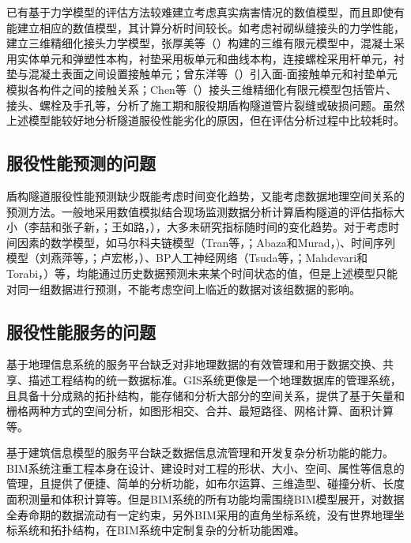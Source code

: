 已有基于力学模型的评估方法较难建立考虑真实病害情况的数值模型，而且即使有能建立相应的数值模型，其计算分析时间较长。如考虑衬砌纵缝接头的力学性能，建立三维精细化接头力学模型，张厚美等（\citeyear{张厚美2000圆形隧道装配式衬砌接头刚度模型研究}）构建的三维有限元模型中，混凝土采用实体单元和弹塑性本构，衬垫采用板单元和曲线本构，连接螺栓采用杆单元，衬垫与混凝土表面之间设置接触单元；曾东洋等（\citeyear{曾东洋2005地铁盾构隧道管片接头刚度影响因素研究}）引入面-面接触单元和衬垫单元模拟各构件之间的接触关系；Chen等（\citeyear{chen2009numerical}）接头三维精细化有限元模型包括管片、接头、螺栓及手孔等，分析了施工期和服役期盾构隧道管片裂缝或破损问题。虽然上述模型能较好地分析隧道服役性能劣化的原因，但在评估分析过程中比较耗时。

\subsection{服役性能预测的问题}

盾构隧道服役性能预测缺少既能考虑时间变化趋势，又能考虑数据地理空间关系的预测方法。一般地采用数值模拟结合现场监测数据分析计算盾构隧道的评估指标大小（李喆和张子新，\citeyear{李喆2005相邻隧道施工对上海地铁二号线的影响分析}；王如路，\citeyear{王如路2009上海软土地铁隧道变形影响因素及变形特征分析}），大多未研究指标随时间的变化趋势。对于考虑时间因素的数学模型，如马尔科夫链模型（Tran等，\citeyear{tran2008prediction}；Abaza和Murad，\citeyear{abaza2009predicting})、时间序列模型（刘燕萍等，\citeyear{刘燕萍2010时间序列分析在建筑物变形监测中的应用}；卢宏彬，\citeyear{卢宏彬2016基于时间序列的结构损伤概率方法研究}）、BP人工神经网络（Tsuda等，\citeyear{tsuda2006estimating}；Mahdevari和Torabi，\citeyear{mahdevari2012prediction}）等，均能通过历史数据预测未来某个时间状态的值，但是上述模型只能对同一组数据进行预测，不能考虑空间上临近的数据对该组数据的影响。

\subsection{服役性能服务的问题}

基于地理信息系统的服务平台缺乏对非地理数据的有效管理和用于数据交换、共享、描述工程结构的统一数据标准。GIS系统更像是一个地理数据库的管理系统，且具备十分成熟的拓扑结构，能存储和分析大部分的空间关系，提供了基于矢量和栅格两种方式的空间分析，如图形相交、合并、最短路径、网格计算、面积计算等。

基于建筑信息模型的服务平台缺乏数据信息流管理和开发复杂分析功能的能力。BIM系统注重工程本身在设计、建设时对工程的形状、大小、空间、属性等信息的管理，且提供了便捷、简单的分析功能，如布尔运算、三维造型、碰撞分析、长度面积测量和体积计算等。但是BIM系统的所有功能均需围绕BIM模型展开，对数据全寿命期的数据流动有一定约束，另外BIM采用的直角坐标系统，没有世界地理坐标系统和拓扑结构，在BIM系统中定制复杂的分析功能困难。

